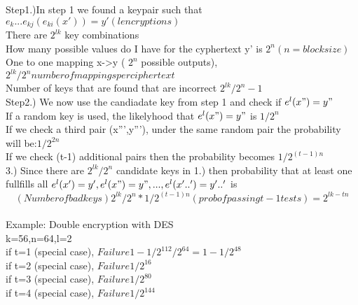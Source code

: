 \documentclass[12pt,letterpaper]{article}
\begin{document}
Step1.)In step 1 we found a keypair such that \(e_{k}...e_{kj}(e_{ki}(x'))=y' (l encryptions) \)\\
There are \(2^{lk}\) key combinations\\

How many possible values do I have for the cyphertext y' is \(2^n (n=blocksize)\)\\
One to one mapping x->y ( \(2^n\) possible outputs), \(2^{lk}/2^n number of mappings per ciphertext \)\\
Number of keys that are found that are incorrect \(2^{lk}/2^n-1\)\\

Step2.)  We now use the candiadate key from step 1 and check if \(e^l(x")=y"\)\\

If a random key is used, the likelyhood that \(e^l(x")=y"\) is \(1/2^n\)\\ 

If we check a third pair (x''',y'''), under the same random pair the probability will be:\(1/2^{2n}\)\\

If we check (t-1) additional pairs then the probability becomes \( 1/2^{(t-1)n}\)\\


3.) Since there are \(2^{lk}/2^n\) candidate keys in 1.) then probability that at least one fullfills all \(e^l(x')=y',e^l(x")=y",...,e^l(x'..')=y'..'\) is \[(Number of bad keys)2^{lk}/2^n*1/2^{(t-1)n}(prob of passing t-1 tests)=2^{lk-tn}\]\\


Example: Double encryption with DES\\
k=56,n=64,l=2\\
if t=1 (special case), \(Failure 1-1/2^{112}/2^{64}=1-1/2^48\)\\
if t=2 (special case), \(Failure 1/2^{16}\)\\
if t=3 (special case), \(Failure 1/2^{80}\)\\
if t=4 (special case), \(Failure 1/2^{144}\)\\
\end{document}
